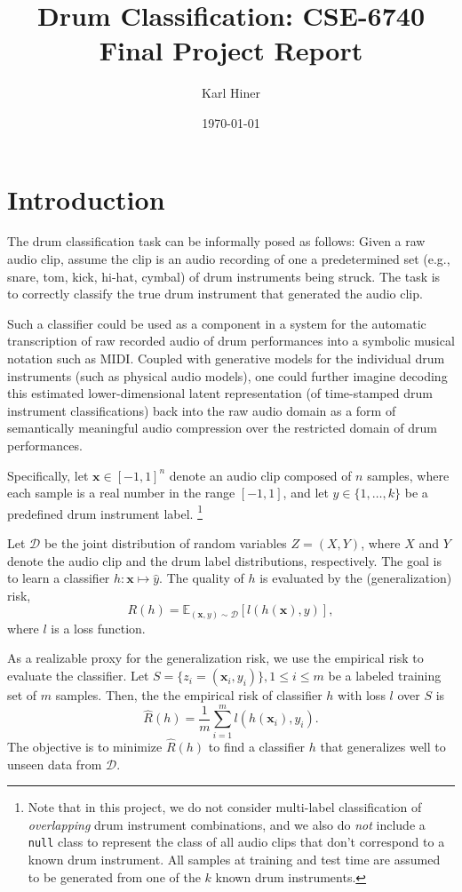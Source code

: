 \documentclass[twocolumn]{article}
\title{Drum Classification: CSE-6740 Final Project Report}
\author{Karl Hiner}
\date{\today}
\begin{document}
\maketitle

\section{Introduction}

The drum classification task can be informally posed as follows:
Given a raw audio clip, assume the clip is an audio recording of one a predetermined set (e.g., snare, tom, kick, hi-hat, cymbal) of drum instruments being struck.
The task is to correctly classify the true drum instrument that generated the audio clip.

Such a classifier could be used as a component in a system for the automatic transcription of raw recorded audio of drum performances into a symbolic musical notation such as MIDI.
Coupled with generative models for the individual drum instruments (such as physical audio models), one could further imagine decoding this estimated lower-dimensional latent representation (of time-stamped drum instrument classifications) back into the raw audio domain as a form of semantically meaningful audio compression over the restricted domain of drum performances.

Specifically, let \( \mathbf{x} \in [-1,1]^n \) denote an audio clip composed of \( n \) samples, where each sample is a real number in the range \([-1,1]\), and let \( y \in \{1, \dots, k\} \) be a predefined drum instrument label.
\footnote{Note that in this project, we do not consider multi-label classification of \textit{overlapping} drum instrument combinations, and we also do \textit{not} include a \texttt{null} class to represent the class of all audio clips that don't correspond to a known drum instrument.
All samples at training and test time are assumed to be generated from one of the $k$ known drum instruments.}

Let \( \mathcal{D} \) be the joint distribution of random variables \( Z = (X, Y) \), where \( X \) and \( Y \) denote the audio clip and the drum label distributions, respectively.
The goal is to learn a classifier \( h: \mathbf{x} \mapsto \hat{y} \).
The quality of \( h \) is evaluated by the (generalization) risk,
$$R(h) = \mathbb{E}_{(\mathbf{x}, y) \sim \mathcal{D}}[l(h(\mathbf{x}), y)],$$
where \( l \) is a loss function.

As a realizable proxy for the generalization risk, we use the empirical risk to evaluate the classifier.
Let \( S = \{z_i = (\mathbf{x}_i, y_i)\}, 1 \leq i \leq m \) be a labeled training set of \( m \) samples.
Then, the the empirical risk of classifier $h$ with loss $l$ over $S$ is
$$\hat{R}(h) = \frac{1}{m} \sum_{i=1}^m l(h(\mathbf{x}_i), y_i).$$
The objective is to minimize \( \hat{R}(h) \) to find a classifier \( h \) that generalizes well to unseen data from \( \mathcal{D} \).
\end{document}
